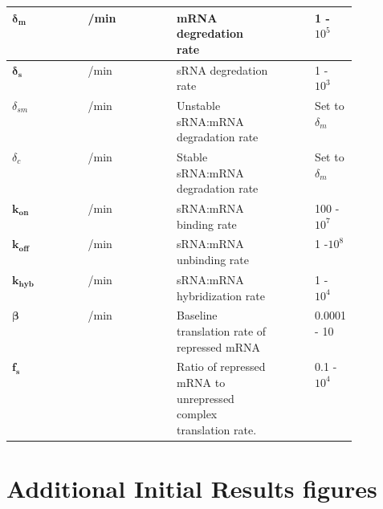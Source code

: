 \documentclass[10pt,journal]{./IEEE_latex_class/IEEEtran}
\begin{document}
\begin{table}[h!]
\begin{tabular}{| l | l | p{0.3\linewidth} | p{0.1\linewidth} | p{0.1\linewidth} |}
\hline $\boldsymbol{\delta_{m}}$ &  /min & mRNA degredation rate & & 1 - $10^5$ \\
\hline $\boldsymbol{\delta_{s}}$ &  /min & sRNA degredation rate & & 1 - $10^3$ \\
\hline $\delta_{sm}$ &  /min & Unstable sRNA:mRNA degradation rate & &  Set to $\delta_m$\\
\hline $\delta_{c}$ &  /min & Stable sRNA:mRNA degradation rate & & Set to $\delta_m$ \\
\hline $\boldsymbol{k_{on}}$ &   /min & sRNA:mRNA binding rate & & 100 - $10^7$\\
\hline $\boldsymbol{k_{off}}$ &  /min & sRNA:mRNA unbinding rate & & 1 -$10^8$\\
\hline $\boldsymbol{k_{hyb}}$ &  /min & sRNA:mRNA hybridization rate & & 1 - $10^4$ \\
\hline $\boldsymbol{\beta}$ &   /min & Baseline translation rate of repressed mRNA & & 0.0001 - 10\\
\hline $\boldsymbol{f_{s}}$ & & Ratio of repressed mRNA to unrepressed complex translation rate. & & 0.1 - $10^4$\\
\hline
\end{tabular}
\end{table}

\clearpage

\section{Additional Initial Results figures}
\label{Additional Initial Results figures}
\setcounter{figure}{0} 
\end{document}
